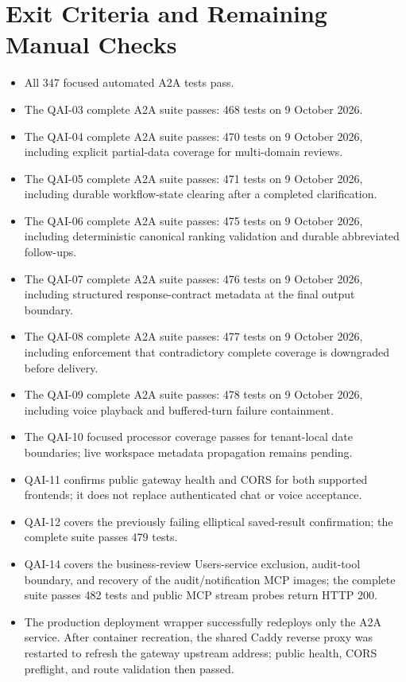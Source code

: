 \documentclass[10pt]{article}
\begin{document}
\section{Exit Criteria and Remaining Manual Checks}
\begin{itemize}[leftmargin=18pt]
\item All 347 focused automated A2A tests pass.
\item The QAI-03 complete A2A suite passes: 468 tests on 9 October 2026.
\item The QAI-04 complete A2A suite passes: 470 tests on 9 October 2026, including explicit partial-data coverage for multi-domain reviews.
\item The QAI-05 complete A2A suite passes: 471 tests on 9 October 2026, including durable workflow-state clearing after a completed clarification.
\item The QAI-06 complete A2A suite passes: 475 tests on 9 October 2026, including deterministic canonical ranking validation and durable abbreviated follow-ups.
\item The QAI-07 complete A2A suite passes: 476 tests on 9 October 2026, including structured response-contract metadata at the final output boundary.
\item The QAI-08 complete A2A suite passes: 477 tests on 9 October 2026, including enforcement that contradictory complete coverage is downgraded before delivery.
\item The QAI-09 complete A2A suite passes: 478 tests on 9 October 2026, including voice playback and buffered-turn failure containment.
\item The QAI-10 focused processor coverage passes for tenant-local date boundaries; live workspace metadata propagation remains pending.
\item QAI-11 confirms public gateway health and CORS for both supported frontends; it does not replace authenticated chat or voice acceptance.
\item QAI-12 covers the previously failing elliptical saved-result confirmation; the complete suite passes 479 tests.
\item QAI-14 covers the business-review Users-service exclusion, audit-tool boundary, and recovery of the audit/notification MCP images; the complete suite passes 482 tests and public MCP stream probes return HTTP 200.
\item The production deployment wrapper successfully redeploys only the A2A service. After container recreation, the shared Caddy reverse proxy was restarted to refresh the gateway upstream address; public health, CORS preflight, and route validation then passed.

\end{itemize}
\end{document}
